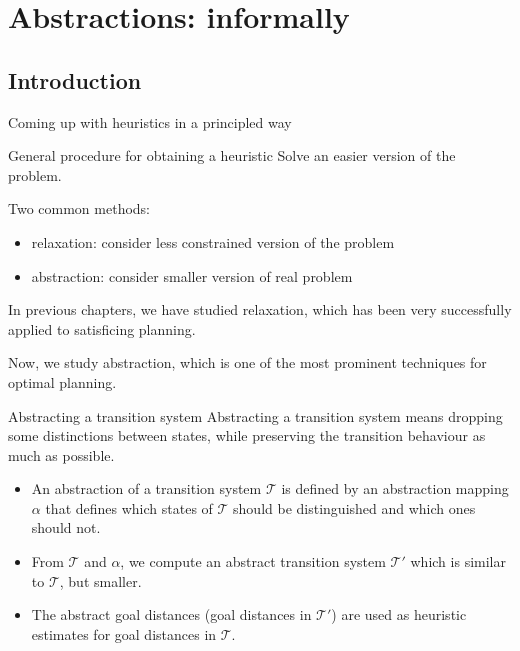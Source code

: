 \documentclass{gkibeamer}
\begin{document}
\subtitle{Planning as search: abstractions}
\date{December 6th, 2011}
\maketitles

\section{Abstractions: informally}
\subsection{Introduction}

\begin{frame}{Coming up with heuristics in a principled way}
  \begin{block}{General procedure for obtaining a heuristic}
    Solve an easier version of the problem.
  \end{block}

  Two common methods:
  \begin{itemize}
  \item \alert{relaxation:} consider \alert{less constrained} version
    of the problem
  \item \alert{abstraction:} consider \alert{smaller} version of real
    problem
  \end{itemize}

  In previous chapters, we have studied \alert{relaxation}, which has
  been very successfully applied to \alert{satisficing planning}.

  \smallskip

  Now, we study \alert{abstraction}, which is one of the most
  prominent techniques for \alert{optimal planning}.
\end{frame}

\begin{frame}{Abstracting a transition system}
  Abstracting a transition system means \alert{dropping some
    distinctions} between states, while \alert{preserving the
  transition behaviour} as much as possible.

  \begin{itemize}
  \item An abstraction of a transition system $\mathcal T$ is defined
    by an \alert{abstraction mapping $\alpha$} that defines which
    states of $\mathcal T$ should be distinguished and which ones
    should not.
  \item From $\mathcal T$ and $\alpha$, we compute an \alert{abstract
    transition system $\mathcal T'$} which is similar to $\mathcal T$,
    but smaller.
  \item The \alert{abstract goal distances} (goal distances in
    $\mathcal T'$) are used as heuristic estimates for goal distances
    in $\mathcal T$.
  \end{itemize}
\end{frame}
\end{document}
